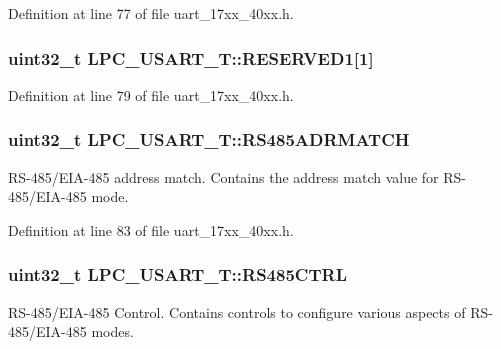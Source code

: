 Definition at line 77 of file uart\+\_\+17xx\+\_\+40xx.\+h.

\subsubsection[{\texorpdfstring{R\+E\+S\+E\+R\+V\+E\+D1}{RESERVED1}}]{ uint32\+\_\+t L\+P\+C\+\_\+\+U\+S\+A\+R\+T\+\_\+\+T\+::\+R\+E\+S\+E\+R\+V\+E\+D1\mbox{[}1\mbox{]}}\hypertarget{structLPC__USART__T_a56453758b5fec0a80c808f746e3db741}{}\label{structLPC__USART__T_a56453758b5fec0a80c808f746e3db741}


Definition at line 79 of file uart\+\_\+17xx\+\_\+40xx.\+h.

\subsubsection[{\texorpdfstring{R\+S485\+A\+D\+R\+M\+A\+T\+CH}{RS485ADRMATCH}}]{ uint32\+\_\+t L\+P\+C\+\_\+\+U\+S\+A\+R\+T\+\_\+\+T\+::\+R\+S485\+A\+D\+R\+M\+A\+T\+CH}\hypertarget{structLPC__USART__T_adfc2810503e8eb5f4d9bc4622500295e}{}\label{structLPC__USART__T_adfc2810503e8eb5f4d9bc4622500295e}
R\+S-\/485/\+E\+I\+A-\/485 address match. Contains the address match value for R\+S-\/485/\+E\+I\+A-\/485 mode. 

Definition at line 83 of file uart\+\_\+17xx\+\_\+40xx.\+h.

\subsubsection[{\texorpdfstring{R\+S485\+C\+T\+RL}{RS485CTRL}}]{ uint32\+\_\+t L\+P\+C\+\_\+\+U\+S\+A\+R\+T\+\_\+\+T\+::\+R\+S485\+C\+T\+RL}\hypertarget{structLPC__USART__T_a6a7e49f50f49efbe8e11befcf6e7d6b4}{}\label{structLPC__USART__T_a6a7e49f50f49efbe8e11befcf6e7d6b4}
R\+S-\/485/\+E\+I\+A-\/485 Control. Contains controls to configure various aspects of R\+S-\/485/\+E\+I\+A-\/485 modes. 

